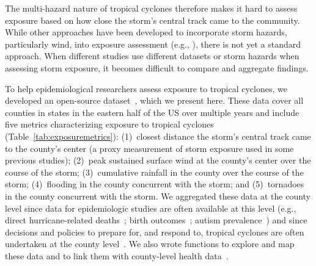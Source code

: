The multi-hazard nature of tropical cyclones therefore makes it hard to assess
exposure based on how close the storm's central track came to the community.
While other approaches have been developed to incorporate storm hazards,
particularly wind, into exposure assessment (e.g., \cite{grabich2015measuring,
zandbergen2009, czajkowski2011}), there is not yet a standard approach. 
When different studies use different datasets or storm hazards when assessing
storm exposure, it becomes difficult to compare and aggregate findings. 

To help epidemiological researchers assess exposure to tropical cyclones, we
developed an open-source dataset~\parencite{hurricaneexposure}, which we
present here.  These data cover all counties in states in the eastern half of
the \ac{US} over multiple years and include five metrics characterizing
exposure to tropical cyclones (Table~\ref{tab:exposuremetrics}): (1)~closest
distance the storm's central track came to the county's center (a proxy
measurement of storm exposure used in some previous studies); (2)~peak
sustained surface wind at the county's center over the course of the storm;
(3)~cumulative rainfall in the county over the course of the storm;
(4)~flooding in the county concurrent with the storm; and (5)~tornadoes in the
county concurrent with the storm.  We aggregated these data at the county level
since data for epidemiologic studies are often available at this level (e.g.,
direct hurricane-related deaths~\parencite{czajkowski2011}; birth
outcomes~\parencite{grabich2015, grabich2015measuring}; autism
prevalence~\parencite{kinney2008}) and since decisions and policies to prepare
for, and respond to, tropical cyclones are often undertaken at the county
level~\parencite{zandbergen2009, rappaport2000}.  We also wrote functions to
explore and map these data and to link them with county-level health
data~\parencite{hurricaneexposuredata}. 

